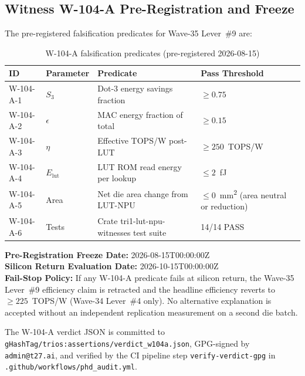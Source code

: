\subsection{Witness W-104-A Pre-Registration and Freeze}

The pre-registered falsification predicates for Wave-35 Lever~\#9 are:

\begin{table}[ht]
\centering
\caption{W-104-A falsification predicates (pre-registered 2026-08-15)}
\label{tab:w104a_predicates}
\begin{tabular}{llp{5.5cm}l}
\hline
ID & Parameter & Predicate & Pass Threshold \\
\hline
W-104-A-1 & $S_3$ & Dot-3 energy savings fraction & $\geq 0.75$ \\
W-104-A-2 & $\epsilon$ & MAC energy fraction of total & $\geq 0.15$ \\
W-104-A-3 & $\eta$ & Effective TOPS/W post-LUT & $\geq 250$~TOPS/W \\
W-104-A-4 & $E_{\mathrm{lut}}$ & LUT ROM read energy per lookup & $\leq 2$~fJ \\
W-104-A-5 & Area & Net die area change from LUT-NPU & $\leq 0$~mm\textsuperscript{2} (area neutral or reduction) \\
W-104-A-6 & Tests & Crate tri1-lut-npu-witnesses test suite & 14/14 PASS \\
\hline
\end{tabular}
\end{table}

\noindent\textbf{Pre-Registration Freeze Date:} 2026-08-15T00:00:00Z \\
\textbf{Silicon Return Evaluation Date:} 2026-10-15T00:00:00Z \\
\textbf{Fail-Stop Policy:} If any W-104-A predicate fails at silicon return,
the Wave-35 Lever~\#9 efficiency claim is retracted and the headline efficiency
reverts to $\geq 225$~TOPS/W (Wave-34 Lever~\#4 only).  No alternative
explanation is accepted without an independent replication measurement on a
second die batch.

The W-104-A verdict JSON is committed to
\texttt{gHashTag/trios:assertions/verdict\_w104a.json}, GPG-signed by
\texttt{admin@t27.ai}, and verified by the CI pipeline step
\texttt{verify-verdict-gpg} in \texttt{.github/workflows/phd\_audit.yml}.

